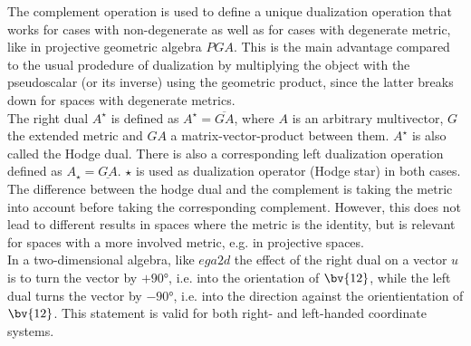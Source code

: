 The complement operation is used to define a unique dualization operation that works for
cases with non-degenerate as well as for cases with degenerate metric, like in projective
geometric algebra $PGA$. This is the main advantage compared to the usual prodedure of
dualization by multiplying the object with the pseudoscalar (or its inverse) using the
geometric product, since the latter breaks down for spaces with degenerate metrics. \\

The right dual $A^{\star}$ is defined as $A^{\star} = \overline{GA}$, where $A$ is an
arbitrary multivector, $G$ the extended metric and $GA$ a matrix-vector-product between
them. $A^{\star}$ is also called the Hodge dual. There is also a corresponding left
dualization operation defined as $A_{\star} = \underline{GA}$. $\star$ is used as
dualization operator (Hodge star) in both cases. The difference between the hodge dual and
the complement is taking the metric into account before taking the corresponding
complement. However, this does not lead to different results in spaces where the metric is
the identity, but is relevant for spaces with a more involved metric, e.g. in projective
spaces. \\

In a two-dimensional algebra, like $ega2d$ the effect of the right dual on a vector $u$ is
to turn the vector by $+90°$, i.e. into the orientation of $\bv{12}$, while the left dual
turns the vector by $-90°$, i.e. into the direction against the orientientation of
$\bv{12}$. This statement is valid for both right- and left-handed coordinate systems. \\

